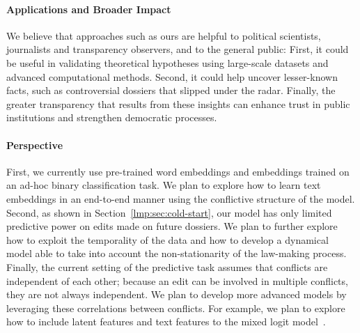\paragraph{Applications and Broader Impact}
We believe that approaches such as ours are helpful to political scientists, journalists and transparency observers, and to the general public:
First, it could be useful in validating theoretical hypotheses using large-scale datasets and advanced computational methods.
Second, it could help uncover lesser-known facts, such as controversial dossiers that slipped under the radar.
Finally, the greater transparency that results from these insights can enhance trust in public institutions and strengthen democratic processes.


\paragraph{Perspective}
First, we currently use pre-trained word embeddings and embeddings trained on an ad-hoc binary classification task.
We plan to explore how to learn text embeddings in an end-to-end manner using the conflictive structure of the \warofwords{} model.
Second, as shown in Section~\ref{lmp:sec:cold-start}, our model has only limited predictive power on edits made on future dossiers.
We plan to further explore how to exploit the temporality of the data and how to develop a dynamical model able to take into account the non-stationarity of the law-making process.
Finally, the current setting of the predictive task assumes that conflicts are independent of each other; because an edit can be involved in multiple conflicts, they are not always independent.
We plan to develop more advanced models by leveraging these correlations between conflicts.
For example, we plan to explore how to include latent features and text features to the mixed logit model~\citep{hensher2003mixed}.

